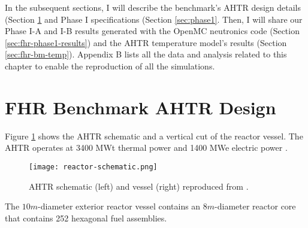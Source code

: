 In the subsequent sections, I will describe the benchmark's \gls{AHTR} design details
(Section \ref{sec:fhr-design} and Phase I specifications (Section \ref{sec:phase1}. 
Then, I will share our Phase I-A and I-B results generated with the OpenMC neutronics 
code \cite{romano_openmc_2013} (Section \ref{sec:fhr-phase1-results}) and the 
\gls{AHTR} temperature model's results (Section \ref{sec:fhr-bm-temp}).  
Appendix B lists all the data and analysis related to this chapter to enable the 
reproduction of all the simulations.

\section{FHR Benchmark \acrlong{AHTR} Design}
\label{sec:fhr-design}
Figure \ref{fig:reactor-schematic} shows the \acrfull{AHTR} schematic and a vertical 
cut of the reactor vessel. 
The \gls{AHTR} operates at 3400 MWt thermal power and 1400 MWe 
electric power \cite{varma_ahtr_2012}. 
\begin{figure}[htbp]
    \centering
    \texttt{[image: reactor-schematic.png]} 
    \caption{\acrfull{AHTR} schematic (left) and vessel (right) reproduced from
    \cite{petrovic_benchmark_2021}.}
    \label{fig:reactor-schematic}
\end{figure}
The $10m$-diameter exterior reactor vessel contains an $8m$-diameter 
reactor core that contains 252 hexagonal fuel assemblies.

